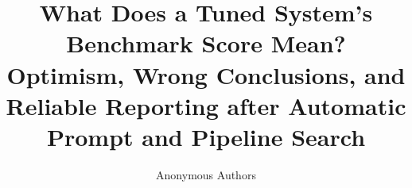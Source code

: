 \documentclass{article}
\title{What Does a Tuned System's Benchmark Score Mean? Optimism, Wrong Conclusions, and Reliable Reporting after Automatic Prompt and Pipeline Search}
\author{Anonymous Authors}
\begin{document}
\maketitle

\begin{abstract}

\end{abstract}










\appendix



\end{document}
